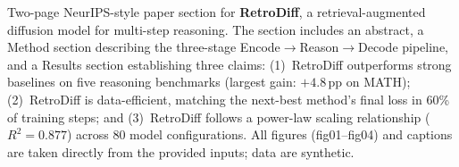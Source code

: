 \caption{Two-page NeurIPS-style paper section for \textbf{RetroDiff}, a retrieval-augmented
diffusion model for multi-step reasoning. The section includes an abstract, a Method section
describing the three-stage Encode$\to$Reason$\to$Decode pipeline, and a Results section
establishing three claims: (1)~RetroDiff outperforms strong baselines on five reasoning
benchmarks (largest gain: $+4.8$\,pp on MATH); (2)~RetroDiff is data-efficient, matching
the next-best method's final loss in 60\% of training steps; and (3)~RetroDiff follows a
power-law scaling relationship ($R^2 = 0.877$) across 80 model configurations. All figures
(fig01--fig04) and captions are taken directly from the provided inputs; data are synthetic.}
